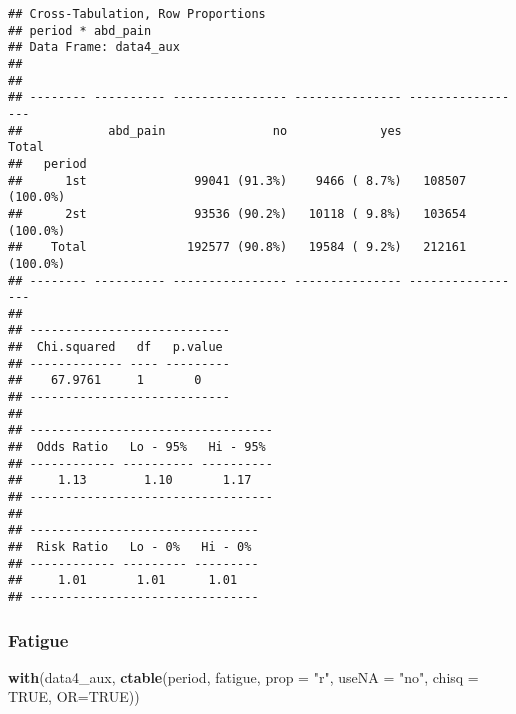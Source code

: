 \documentclass[
]{article}
\newenvironment{Shaded}{\begin{snugshade}}{\end{snugshade}}
\newcommand{\DataTypeTok}[1]{\textcolor[rgb]{0.13,0.29,0.53}{#1}}
\newcommand{\KeywordTok}[1]{\textcolor[rgb]{0.13,0.29,0.53}{\textbf{#1}}}
\newcommand{\NormalTok}[1]{#1}
\newcommand{\OtherTok}[1]{\textcolor[rgb]{0.56,0.35,0.01}{#1}}
\newcommand{\StringTok}[1]{\textcolor[rgb]{0.31,0.60,0.02}{#1}}
\begin{document}
\begin{verbatim}
## Cross-Tabulation, Row Proportions  
## period * abd_pain  
## Data Frame: data4_aux  
## 
## 
## -------- ---------- ---------------- --------------- -----------------
##            abd_pain               no             yes             Total
##   period                                                              
##      1st               99041 (91.3%)    9466 ( 8.7%)   108507 (100.0%)
##      2st               93536 (90.2%)   10118 ( 9.8%)   103654 (100.0%)
##    Total              192577 (90.8%)   19584 ( 9.2%)   212161 (100.0%)
## -------- ---------- ---------------- --------------- -----------------
## 
## ----------------------------
##  Chi.squared   df   p.value 
## ------------- ---- ---------
##    67.9761     1       0    
## ----------------------------
## 
## ----------------------------------
##  Odds Ratio   Lo - 95%   Hi - 95% 
## ------------ ---------- ----------
##     1.13        1.10       1.17   
## ----------------------------------
## 
## --------------------------------
##  Risk Ratio   Lo - 0%   Hi - 0% 
## ------------ --------- ---------
##     1.01       1.01      1.01   
## --------------------------------
\end{verbatim}

\hypertarget{fatigue}{%
\subsubsection{Fatigue}\label{fatigue}}

\begin{Shaded}
\begin{Highlighting}[]
\KeywordTok{with}\NormalTok{(data4_aux, }\KeywordTok{ctable}\NormalTok{(period, fatigue, }\DataTypeTok{prop =} \StringTok{"r"}\NormalTok{, }\DataTypeTok{useNA =} \StringTok{"no"}\NormalTok{, }\DataTypeTok{chisq =} \OtherTok{TRUE}\NormalTok{, }\DataTypeTok{OR=}\OtherTok{TRUE}\NormalTok{))}
\end{Highlighting}
\end{Shaded}
\end{document}
